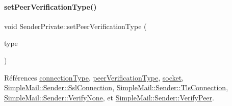 \paragraph{\texorpdfstring{set\+Peer\+Verification\+Type()}{setPeerVerificationType()}}
{\footnotesize\ttfamily void Sender\+Private\+::set\+Peer\+Verification\+Type (\begin{DoxyParamCaption}\item[{const \hyperlink{class_simple_mail_1_1_sender_acfbcf388ab7c26cd41c5c77601fe8804}{Sender\+::\+Peer\+Verification\+Type} \&}]{type }\end{DoxyParamCaption})}



Références \hyperlink{class_simple_mail_1_1_sender_private_a2d09eb5d137213e97f10228f8ed68134}{connection\+Type}, \hyperlink{class_simple_mail_1_1_sender_private_ab6854bd0a124acdc3e21aef40e59c41a}{peer\+Verification\+Type}, \hyperlink{class_simple_mail_1_1_sender_private_a223cab47555a39f45f30569328fa20bc}{socket}, \hyperlink{class_simple_mail_1_1_sender_a89e6a9572b306441237f6b6635729d1aadd47ac04a99ebb279aaa4cf5cdfa78f5}{Simple\+Mail\+::\+Sender\+::\+Ssl\+Connection}, \hyperlink{class_simple_mail_1_1_sender_a89e6a9572b306441237f6b6635729d1aa3461f2931e043fc3ea86a0015c735159}{Simple\+Mail\+::\+Sender\+::\+Tls\+Connection}, \hyperlink{class_simple_mail_1_1_sender_acfbcf388ab7c26cd41c5c77601fe8804a22f77592aa7f05238f2d1f25a13169c1}{Simple\+Mail\+::\+Sender\+::\+Verify\+None}, et \hyperlink{class_simple_mail_1_1_sender_acfbcf388ab7c26cd41c5c77601fe8804ac24a70d89382bb95b91501222056c389}{Simple\+Mail\+::\+Sender\+::\+Verify\+Peer}.


